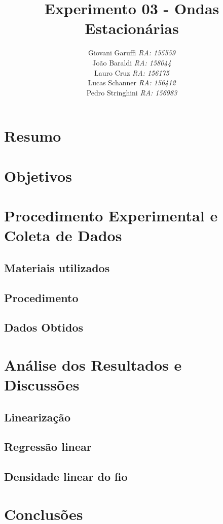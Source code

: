 \documentclass[12pt,a4paper]{article}
\begin{document}
\title{\vspace{70mm}\Huge Experimento 03 - Ondas Estacionárias}
\author{ Giovani Garuffi\qquad\hfill
		\textit {RA: 155559}\protect\\
		João Baraldi\hfill
		\textit{RA: 158044}\protect\\
		Lauro Cruz\hfill
		\textit{RA: 156175}\protect\\
		Lucas Schanner\hfill
		\textit{RA: 156412}\protect\\
		Pedro Stringhini\hfill
		\textit {RA: 156983}								
		}
\maketitle
\newpage
\section{Resumo}

\section{Objetivos}


\section{Procedimento Experimental e Coleta de Dados}

\subsection{Materiais utilizados}


\subsection{Procedimento}




\subsection{Dados Obtidos}







\section{Análise dos Resultados e Discussões}
\subsection{Linearização}
\subsection{Regressão linear}
\subsection{Densidade linear do fio}




\section{Conclusões}


\begin{thebibliography}{9}


\end{thebibliography}
\end{document}
